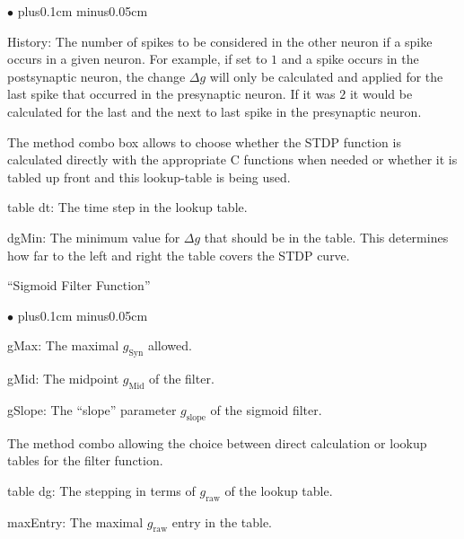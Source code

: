 \documentclass{article}
\newenvironment{myitem}{\begin{list}{$\bullet$}{\setlength{\leftmargin}{1.1em}
\itemsep0.1cm plus0.1cm minus0.05cm
\listparindent0cm
\addtolength{\labelsep}{0.5\labelsep}
\setlength{\labelwidth}{0.8em}
\setlength{\leftmargin}{\labelwidth}
\addtolength{\leftmargin}{\labelsep}
}}{\end{list}}
\begin{document}
\begin{myitem}
\item History: The number of spikes to be considered in the other
  neuron if a spike occurs in a given neuron. For example, if set to
  $1$ and a spike occurs in the postsynaptic neuron, the change 
  $\Delta g$ will only be calculated and applied for the last spike
  that occurred in the presynaptic neuron. If it was $2$ it would be
  calculated for the last and the next to last spike in the
  presynaptic neuron.
\item The method combo box allows to choose whether the STDP function is
  calculated directly with the appropriate C functions when needed or
  whether it is tabled up front and this lookup-table is being used.
\item table dt: The time step in the lookup table.
\item dgMin: The minimum value for $\Delta g$ that should be in the
  table. This determines how far to the left and right the table
  covers the STDP curve.
\end{myitem}
``Sigmoid Filter Function''
\begin{myitem}
\item gMax: The maximal $g_{\text{Syn}}$ allowed.
\item gMid: The midpoint $g_{\text{Mid}}$ of the filter.
\item gSlope: The ``slope'' parameter $g_{\text{slope}}$ of the sigmoid filter. 
\item The method combo allowing the choice between direct calculation
  or lookup tables for the filter function.
\item table dg: The stepping in terms of $g_{\text{raw}}$ of the
  lookup table.
\item maxEntry: The maximal $g_{\text{raw}}$ entry in the table.
\end{myitem}
\end{document}
